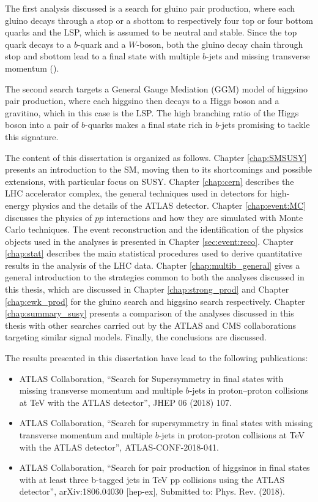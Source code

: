\documentclass[10pt,a4paper]{article}
\begin{document}
The first analysis discussed is a search for gluino pair production, where each gluino decays through a stop or a sbottom 
to respectively four top or four bottom quarks and the LSP, which is assumed to be neutral and stable.
Since the top quark decays to a $b$-quark and a $W$-boson, both the gluino decay chain through stop and sbottom lead to a 
final state with multiple $b$-jets and missing transverse momentum (\met). 

The second search targets a General Gauge Mediation (GGM) model of higgsino pair production, where each higgsino then decays to a Higgs boson and 
a gravitino, which in this case is the LSP. The high branching ratio of the Higgs boson into a pair of $b$-quarks makes a final state 
rich in $b$-jets promising to tackle this signature.

The content of this dissertation is organized as follows. Chapter \ref{chap:SMSUSY} presents an introduction to the SM, 
moving then to its shortcomings and possible extensions, with particular focus on SUSY. 
Chapter \ref{chap:cern} describes the LHC accelerator complex, the general techniques used in detectors 
for high-energy physics and the details of the ATLAS detector. 
Chapter \ref{chap:event:MC} discusses the physics of $pp$ interactions and how they are simulated with Monte Carlo techniques. 
The event reconstruction and the identification of the physics objects used in the analyses is presented in Chapter \ref{sec:event:reco}. 
Chapter \ref{chap:stat} describes the main statistical procedures used to derive quantitative results in the analysis of the LHC data.
Chapter \ref{chap:multib_general} gives a general introduction to the strategies common to both the analyses discussed in this thesis, 
which are discussed in Chapter \ref{chap:strong_prod} and Chapter \ref{chap:ewk_prod} for the gluino search and 
higgsino search respectively. 
Chapter \ref{chap:summary_susy} presents a comparison of the analyses discussed in this thesis with other searches carried out 
by the ATLAS and CMS collaborations targeting similar signal models. 
Finally, the conclusions are discussed. 

The results presented in this dissertation have lead to the following publications:

\begin{itemize}
\item  ATLAS Collaboration, ``Search for Supersymmetry in final states with missing transverse momentum and multiple $b$-jets in proton–proton collisions at \cmtre TeV with the ATLAS detector'', JHEP 06 (2018) 107. 
\item  ATLAS Collaboration, ``Search for supersymmetry in final states with missing transverse momentum and multiple $b$-jets in proton-proton collisions at \cmtre TeV with the ATLAS detector'', ATLAS-CONF-2018-041.
\item  ATLAS Collaboration, ``Search for pair production of higgsinos in final states with at least three b-tagged jets in \cmtre TeV pp collisions using the ATLAS detector'',  
arXiv:1806.04030 [hep-ex], 
Submitted to: Phys. Rev. (2018).
\end{itemize}
\end{document}
